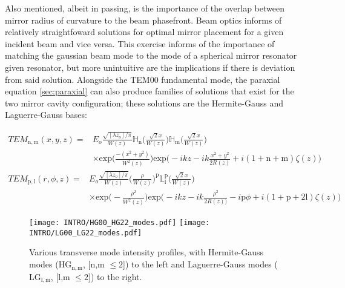 Also mentioned, albeit in passing, is the importance of the overlap between mirror radius of curvature to the beam phasefront. Beam optics informs of relatively straightfoward solutions for optimal mirror placement for a given incident beam and vice versa. This exercise informs of the importance of matching the gaussian beam mode to the mode of a spherical mirror resonator given resonator, but more unintuitive are the implications if there is deviation from said solution. Alongside the TEM00 fundamental mode, the paraxial equation \autoref{sec:paraxial} can also produce families of solutions that exist for the two mirror cavity configuration; these solutions are the Hermite-Gauss and Laguerre-Gauss bases:

\begin{equation}\label{eq:HG_beam}
	\begin{split}
		TEM_\mathrm{n,m}(x,y,z) = & E_o \frac{\sqrt{[\lambda z_o] / \pi}}{W(z)}\mathbb{H}_\mathrm{n}\bigg(\frac{\sqrt{2}x}{W(z)}\bigg)\mathbb{H}_\mathrm{m}\bigg(\frac{\sqrt{2}x}{W(z)}\bigg)\\
					& \times \mathrm{exp}\bigg(\frac{-(x^2+y^2)}{W^2(z)}\bigg) \mathrm{exp}\bigg(-ikz - ik\frac{x^2 + y^2}{2R(z)} + i (1+\mathrm{n}+\mathrm{m})\zeta(z)\bigg)
	\end{split}
\end{equation}
\begin{equation}\label{eq:LG_beam}
	\begin{split}
	TEM_\mathrm{p,l}(r,\phi,z) = & E_o \frac{\sqrt{[\lambda z_o] / \pi}}{W(z)} \bigg(\frac{\rho}{W(z)}\bigg)^\mathrm{p}\mathbb{L}^{\mathrm{p}}_{\mathrm{l}}\bigg(\frac{\sqrt{2}x}{W(z)}\bigg)\\
				   &  \times \mathrm{exp}\bigg(-\frac{\rho^2}{W^2(z)}\bigg) \mathrm{exp}\bigg(-ikz - ik\frac{\rho^2}{2R(z))} - i\mathrm{p}\phi + i (1+\mathrm{p}+2\mathrm{l})\zeta(z)\bigg)
	\end{split}
\end{equation}

\begin{figure}[h!]
  \begin{subcaptiongroup}
	  \texttt{[image: INTRO/HG00\_HG22\_modes.pdf]}
	  \hspace{3.5mm}
	  \texttt{[image: INTRO/LG00\_LG22\_modes.pdf]}
  \end{subcaptiongroup}
  \hfill
  \caption{Various transverse mode intensity profiles, with Hermite-Gauss modes ($\mathrm{HG}_\mathrm{n,m}$, [n,m \hspace{.01pt} $\leq 2$]) to the left and Laguerre-Gauss modes ($\mathrm{LG}_\mathrm{l,m}$,  [l,m \hspace{.01pt} $\leq 2$]) to the right.}
  \label{fig:HGLG_modes}
\end{figure}

